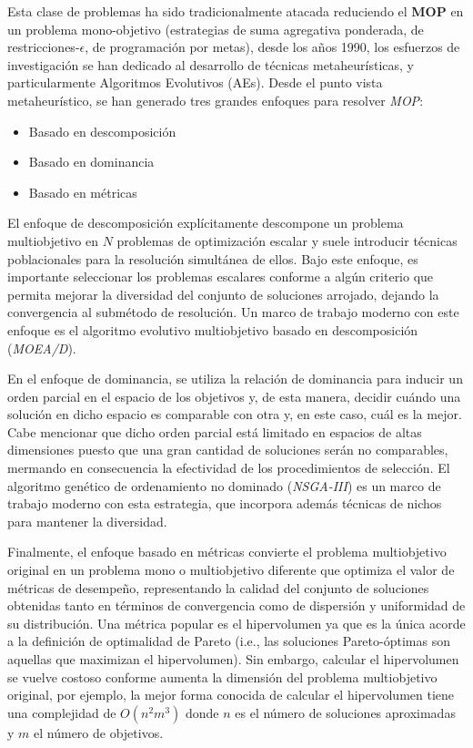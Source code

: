 \documentclass[letterpaper,10pt]{article}
\begin{document}
Esta clase de problemas ha sido tradicionalmente atacada reduciendo el \textbf{MOP} en un problema mono-objetivo (estrategias de suma agregativa ponderada, de restricciones-$\epsilon$,
de programación por metas), desde los años 1990, los esfuerzos de investigación se han dedicado al desarrollo de técnicas metaheurísticas, y particularmente Algoritmos Evolutivos (AEs).
Desde el punto vista metaheurístico, se han generado tres grandes enfoques para resolver \emph{MOP}:

\begin{itemize}
 \item Basado en descomposición
 \item Basado en dominancia
 \item Basado en métricas
\end{itemize}

El enfoque de descomposición explícitamente descompone un problema multiobjetivo en $N$ problemas de optimización escalar y suele introducir técnicas poblacionales para
la resolución simultánea de ellos. Bajo este enfoque, es importante seleccionar los problemas escalares conforme a algún criterio que permita mejorar la diversidad del conjunto
de soluciones arrojado, dejando la convergencia al submétodo de resolución. Un marco de trabajo moderno con este enfoque es el algoritmo evolutivo multiobjetivo basado en
descomposición (\emph{MOEA/D})\cite{4358754}.
\newline

En el enfoque de dominancia, se utiliza la relación de dominancia para inducir un orden parcial en el espacio de los objetivos y, de esta manera, decidir cuándo una solución
en dicho espacio es comparable con otra y, en este caso, cuál es la mejor. Cabe mencionar que dicho orden parcial está limitado en espacios de altas dimensiones puesto que una gran
cantidad de soluciones serán no comparables, mermando en consecuencia la efectividad de los procedimientos de selección. El algoritmo genético de ordenamiento no dominado
(\emph{NSGA-III})\cite{6600851} es un marco de trabajo moderno con esta estrategia, que incorpora además técnicas de nichos para mantener la diversidad.
\newline

Finalmente, el enfoque basado en métricas convierte el problema multiobjetivo original en un problema mono o multiobjetivo diferente que optimiza el valor de métricas de desempeño,
representando la calidad del conjunto de soluciones obtenidas tanto en términos de convergencia como de dispersión y uniformidad de su distribución. Una métrica popular
es el hipervolumen ya que es la única acorde a la definición de  optimalidad de Pareto (i.e., las soluciones Pareto-óptimas son aquellas que maximizan el hipervolumen).
Sin embargo, calcular el hipervolumen se vuelve costoso conforme aumenta la dimensión del problema multiobjetivo original, por ejemplo, la mejor forma conocida de calcular
el hipervolumen tiene una complejidad de $O(n^2m^3)$ donde $n$ es el número de soluciones aproximadas y $m$ el número de objetivos.
\newline
\end{document}
